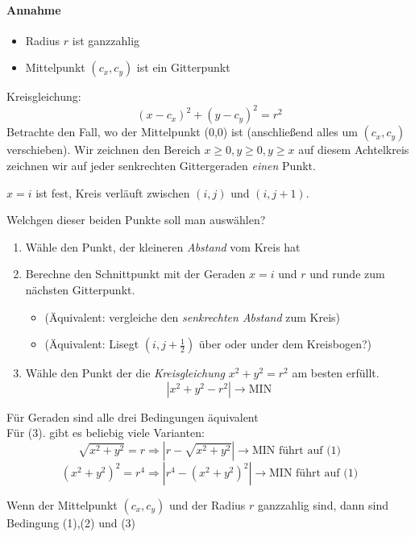 \paragraph*{Annahme}
	\begin{itemize}
	 \item	Radius $r$ ist ganzzahlig
	 \item	Mittelpunkt $(c_x,c_y)$ ist ein Gitterpunkt
	\end{itemize}
	Kreisgleichung:
	\[(x-c_x)^2 + (y - c_y)^2 = r^2\]
	Betrachte den Fall, wo der Mittelpunkt (0,0) ist (anschließend alles um $(c_x,c_y)$ verschieben).
	Wir zeichnen den Bereich $x \ge 0, y \ge 0, y \ge x$ auf diesem Achtelkreis zeichnen wir auf jeder senkrechten
	Gittergeraden \emph{einen} Punkt.
	\begin{center}
	\end{center}
	$x=i$ ist fest, Kreis verläuft zwischen $(i,j)$ und $(i,j+1)$.
	\begin{center}
	\end{center}
	Welchgen dieser beiden Punkte soll man auswählen?
	\begin{enumerate}
	 \renewcommand*\theenumi{(\arabic{enumi})}
	 \item	Wähle den Punkt, der kleineren \emph{Abstand} vom Kreis hat
	 \item	Berechne den Schnittpunkt mit der Geraden $x=i$ und $r$ und runde zum nächsten Gitterpunkt.
		\begin{itemize}
		 \item (Äquivalent: vergleiche den \emph{senkrechten Abstand} zum Kreis)
		 \item (Äquivalent: Lisegt $(i, j+\frac{1}{2})$ über oder under dem Kreisbogen?)
		\end{itemize}
	 \item	Wähle den Punkt der die \emph{Kreisgleichung} $x^2 + y^2 = r^2$ am besten erfüllt.
		\[|x^2 + y^2 - r^2| \to \mathrm{MIN}\]
	\end{enumerate}
	Für Geraden sind alle drei Bedingungen äquivalent\\
	Für (3). gibt es beliebig viele Varianten:
	\[\sqrt{x^2 + y^2} = r \Rightarrow |r - \sqrt{x^2 + y^2}| \to \mathrm{MIN} \text{ führt auf (1)}\]
	\[(x^2 + y^2)^2 = r^4 \Rightarrow |r^4 - (x^2 + y^2)^2| \to \mathrm{MIN} \text{ führt auf (1)}\]
	\begin{center}
	\end{center}
\Satz	Wenn der Mittelpunkt $(c_x,c_y)$ und der Radius $r$ ganzzahlig sind, dann sind Bedingung (1),(2) und (3)
